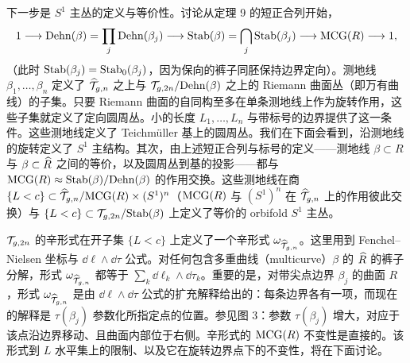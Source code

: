 \begin{itemize}[leftmargin=1.6em,itemsep=2pt,topsep=2pt]
下一步是 $S^1$ 主丛的定义与等价性。讨论从定理 9 的短正合列开始，
\[
1\longrightarrow\mathrm{Dehn}(\beta)=\prod_j\mathrm{Dehn}(\beta_j)\longrightarrow\mathrm{Stab}(\beta)=\bigcap_j\mathrm{Stab}(\beta_j)\longrightarrow\mathrm{MCG}(R)\longrightarrow 1,
\]
（此时 $\mathrm{Stab}(\beta_j)=\mathrm{Stab}_0(\beta_j)$，因为保向的裤子同胚保持边界定向）。测地线 $\beta_1,\dots,\beta_n$ 定义了 $\widehat{\mathcal{T}}_{g,n}$ 之上与 $\mathcal{T}_{g,2n}/\mathrm{Dehn}(\beta)$ 之上的 Riemann 曲面丛（即万有曲线）的子集。只要 Riemann 曲面的自同构至多在单条测地线上作为旋转作用，这些子集就定义了定向圆周丛。小的长度 $L_1,\dots,L_n$ 与带标号的边界提供了这一条件。这些测地线定义了 Teichmüller 基上的圆周丛。我们在下面会看到，沿测地线的旋转定义了 $S^1$ 主结构。其次，由上述短正合列与标号的定义——测地线 $\beta\subset R$ 与 $\beta\subset\widehat{R}$ 之间的等价，以及圆周丛到基的投影——都与 $\mathrm{MCG}(R)\approx\mathrm{Stab}(\beta)/\mathrm{Dehn}(\beta)$ 的作用交换。这些测地线在商 $\{L<c\}\subset\widehat{\mathcal{T}}_{g,n}/\mathrm{MCG}(R)\times(S^1)^n$（$\mathrm{MCG}(R)$ 与 $(S^1)^n$ 在 $\widehat{\mathcal{T}}_{g,n}$ 上的作用彼此交换）与 $\{L<c\}\subset\mathcal{T}_{g,2n}/\mathrm{Stab}(\beta)$ 上定义了等价的 orbifold $S^1$ 主丛。

$\mathcal{T}_{g,2n}$ 的辛形式在开子集 $\{L<c\}$ 上定义了一个辛形式 $\omega_{\widehat{\mathcal{T}}_{g,n}}$。这里用到 Fenchel--Nielsen 坐标与 $\dd\ell\wedge\dd\tau$ 公式。对任何包含多重曲线（multicurve）$\beta$ 的 $\widehat{R}$ 的裤子分解，形式 $\omega_{\widehat{\mathcal{T}}_{g,n}}$ 都等于 $\sum_k\dd\ell_k\wedge\dd\tau_k$。重要的是，对带尖点边界 $\beta_j$ 的曲面 $R$，形式 $\omega_{\widehat{\mathcal{T}}_{g,n}}$ 是由 $\dd\ell\wedge\dd\tau$ 公式的扩充解释给出的：每条边界各有一项，而现在的解释是 $\tau(\beta_j)$ 参数化所指定点的位置。参见图 3：参数 $\tau(\beta_j)$ 增大，对应于该点沿边界移动、且曲面内部位于右侧。辛形式的 $\mathrm{MCG}(R)$ 不变性是直接的。该形式到 $L$ 水平集上的限制、以及它在旋转边界点下的不变性，将在下面讨论。
\end{itemize}


